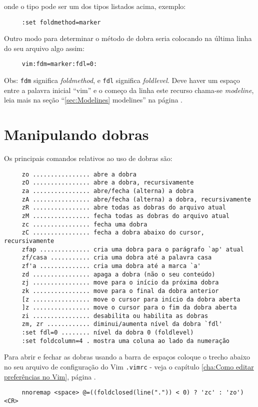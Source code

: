 onde o tipo pode ser um dos tipos listados acima, exemplo:
\begin{verbatim}
     :set foldmethod=marker
\end{verbatim}

Outro modo para determinar o método de dobra seria colocando na última
linha do seu arquivo algo assim:
\begin{verbatim}
     vim:fdm=marker:fdl=0:
\end{verbatim}

Obs: \verb|fdm| significa {\em foldmethod}, e \verb|fdl| significa
{\em foldlevel}. Deve haver um espaço entre a palavra inicial ``vim'' e o
começo da linha este recurso chama-se {\em modeline}, leia mais na seção
``\ref{sec:Modelines} modelines'' na página \pageref{sec:Modelines}.

\section{Manipulando dobras }
\label{Manipulando dobras }

Os principais comandos relativos ao uso de dobras são:
\begin{verbatim}
     zo ................ abre a dobra
     zO ................ abre a dobra, recursivamente
     za ................ abre/fecha (alterna) a dobra
     zA ................ abre/fecha (alterna) a dobra, recursivamente
     zR ................ abre todas as dobras do arquivo atual
     zM ................ fecha todas as dobras do arquivo atual
     zc ................ fecha uma dobra
     zC ................ fecha a dobra abaixo do cursor, recursivamente
     zfap .............. cria uma dobra para o parágrafo `ap' atual
     zf/casa ........... cria uma dobra até a palavra casa
     zf'a .............. cria uma dobra até a marca `a'
     zd ................ apaga a dobra (não o seu conteúdo)
     zj ................ move para o início da próxima dobra
     zk ................ move para o final da dobra anterior
     [z ................ move o cursor para início da dobra aberta
     ]z ................ move o cursor para o fim da dobra aberta
     zi ................ desabilita ou habilita as dobras
     zm, zr ............ diminui/aumenta nível da dobra `fdl'
     :set fdl=0 ........ nível da dobra 0 (foldlevel)
     :set foldcolumn=4 . mostra uma coluna ao lado da numeração
\end{verbatim}

Para abrir e fechar as dobras usando a barra de
espaços coloque o trecho abaixo no seu arquivo de configuração do Vim
\verb|.vimrc| - veja o capítulo \ref{cha:Como editar preferências no Vim}, página
\pageref{cha:Como editar preferências no Vim}.
\begin{verbatim}
     nnoremap <space> @=((foldclosed(line(".")) < 0) ? 'zc' : 'zo')<CR>
\end{verbatim}

